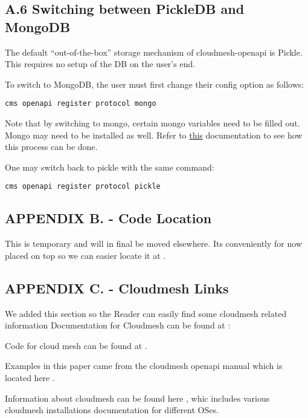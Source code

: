 \subsection{A.6 Switching between PickleDB and
MongoDB}\label{a.6-switching-between-pickledb-and-mongodb}

The default ``out-of-the-box'' storage mechanism of cloudmesh-openapi is
Pickle. This requires no setup of the DB on the user's end.

To switch to MongoDB, the user must first change their config option as
follows:

\begin{verbatim}
cms openapi register protocol mongo
\end{verbatim}

Note that by switching to mongo, certain mongo variables need to be
filled out. Mongo may need to be installed as well. Refer to
\href{https://github.com/cloudmesh/cloudmesh-openapi/\#installation}{this}
documentation to see how this process can be done.

One may switch back to pickle with the same command:

\begin{verbatim}
cms openapi register protocol pickle
\end{verbatim}

\subsection{APPENDIX B. - Code
Location}\label{appendix-b.---code-location}

This is temporary and will in final be moved elsewhere. Its conveniently
for now placed on top so we can easier locate it at \cite{cloudmesh-openapi}.


\subsection{APPENDIX C. - Cloudmesh
Links}\label{appendix-c.---cloudmesh-links}

We added this section so the Reader can easily find some cloudmesh
related information Documentation for Cloudmesh can be found at \cite{cloudmesh-manual}:

Code for cloud mesh can be found at \cite{cloudmesh-github}.

Examples in this paper came from the cloudmesh openapi manual which is
located here \cite{cloudmesh-openapi}.

Information about cloudmesh can be found here \cite{cloudmesh-manual},
whic includes various cloudmesh installations documentation for
different OSes.

